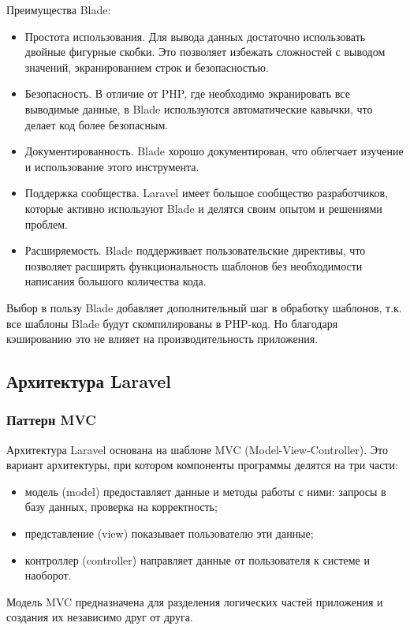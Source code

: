 Преимущества Blade:
\begin{itemize}
	\item Простота использования. Для вывода данных достаточно использовать двойные фигурные скобки. Это позволяет избежать сложностей с выводом значений, экранированием строк и безопасностью.
	\item Безопасность. В отличие от PHP, где необходимо экранировать все выводимые данные, в Blade используются автоматические кавычки, что делает код более безопасным.
	\item Документированность. Blade хорошо документирован, что облегчает изучение и использование этого инструмента.
	\item Поддержка сообщества. Laravel имеет большое сообщество разработчиков, которые активно используют Blade и делятся своим опытом и решениями проблем.
	\item Расширяемость. Blade поддерживает пользовательские директивы, что позволяет расширять функциональность шаблонов без необходимости написания большого количества кода.
\end{itemize}

Выбор в пользу Blade добавляет дополнительный шаг в обработку шаблонов, т.к. все шаблоны Blade будут скомпилированы в PHP-код. Но благодаря кэшированию это не влияет на производительность приложения.

\subsection{Архитектура Laravel}
\subsubsection{Паттерн MVC}
Архитектура Laravel основана на шаблоне MVC (Model-View-Controller).
Это вариант архитектуры, при котором компоненты программы делятся на три части:
\begin{itemize}
	\item модель (model) предоставляет данные и методы работы с ними: запросы в базу данных, проверка на корректность;
	\item представление (view) показывает пользователю эти данные;
	\item контроллер (controller) направляет данные от пользователя к системе и наоборот.
\end{itemize}

Модель MVC предназначена для разделения логических частей приложения и создания их независимо друг от друга. 

